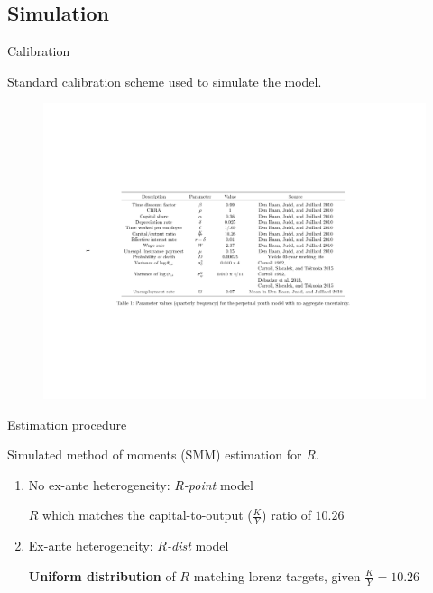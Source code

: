 \documentclass{beamer}
\begin{document}
\subsection{Simulation}

\begin{frame}{Calibration}

Standard calibration scheme used to simulate the model.

  \vfill
   \begin{figure}
    \centering
    \includegraphics[width=.85\linewidth]{Tables/calibrationPY.pdf}
  \end{figure}
  \vfill

\end{frame}


\begin{frame}{Estimation procedure}


Simulated method of moments (SMM) estimation for $R$.

  \begin{enumerate}
  \item No ex-ante heterogeneity: $R$\textit{-point} model
  \par $R$ which matches the capital-to-output ($\frac{K}{Y}$) ratio of $10.26$
  \vspace{2.5mm}
  
  \item Ex-ante heterogeneity: $R$\textit{-dist} model 
  \par \textbf{Uniform distribution} of $R$ matching lorenz targets, given $\frac{K}{Y} = 10.26$ 
  \end{enumerate}
 
  
\end{frame}
\end{document}
